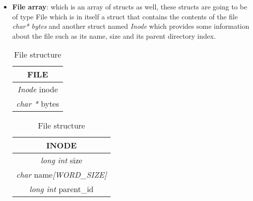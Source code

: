 \begin{itemize}
    \newpage
    \item \textbf{File array}: which is an array of structs as well, these structs are going to be of type File which is in itself a struct that contains the contents of the file \textit{char* bytes} and another struct named \textit{Inode} which provides some information about the file such as its name, size and its parent directory index.\\

    \begin{table}[hbt!]
        \centering
        \begin{tabular}{|c|}
            \hline
            \textbf{FILE} \\
            \hline
            \textit{Inode} inode \\
            \textit{char *} bytes \\
            \hline
        \end{tabular}
        \caption{File structure}
        \label{tab:my_label}
    \end{table}

    \begin{table}[hbt!]
        \centering
        \begin{tabular}{|c|}
            \hline
            \textbf{INODE} \\
            \hline
            \textit{long int} size\\
            \textit{char} name\textit{[WORD\_SIZE]} \\
            \textit{long int} parent\_id \\
            \hline
        \end{tabular}
        \caption{File structure}
        \label{tab:my_label}
    \end{table}
 
\end{itemize}









\newpage